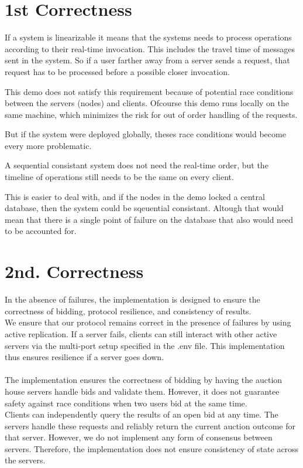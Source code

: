 \documentclass[a4paper,11pt]{article}
\begin{document}
\section{1st Correctness}
If a system is linearizable it means that the systems needs to process operations according to their real-time invocation.
This includes the travel time of messages sent in the system. So if a user farther away from a server sends a request,
that request has to be processed before a possible closer invocation.

This demo does not satisfy this requirement because of potential race conditions between the servers (nodes) and clients.
Ofcourse this demo runs locally on the same machine, which minimizes the risk for out of order handling of the requests.

But if the system were deployed globally, theses race conditions would become every more problematic.


A sequential consistant system does not need the real-time order, but the timeline of operations still needs to be the same on every client.

This is easier to deal with, and if the nodes in the demo locked a central database, then the system could be sqeuential consistant.
Altough that would mean that there is a single point of failure on the database that also would need to be accounted for.

\section{2nd. Correctness}
In the absence of failures, the implementation is designed to ensure the correctness of bidding, protocol resilience, and consistency of results.
\\
We ensure that our protocol remains correct in the presence of failures by using active replication. If a server fails, clients can still interact with other active servers via the multi-port setup specified in the .env file. This implementation thus ensures resilience if a server goes down.
\\
\\
The implementation ensures the correctness of bidding by having the auction house servers handle bids and validate them. However, it does not guarantee safety against race conditions when two users bid at the same time.
\\
Clients can independently query the results of an open bid at any time. The servers handle these requests and reliably return the current auction outcome for that server. However, we do not implement any form of consensus between servers. Therefore, the implementation does not ensure consistency of state across the servers.
\\
\end{document}
